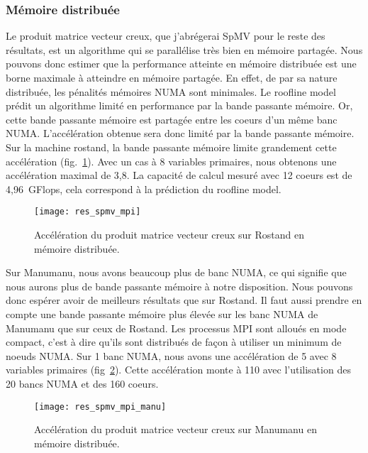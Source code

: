 \subsubsection{Mémoire distribuée}
Le produit matrice vecteur creux, que j'abrégerai SpMV pour le reste des résultats, est un algorithme qui se parallélise très bien en mémoire partagée.
%
Nous pouvons donc estimer que la performance atteinte en mémoire distribuée est une borne maximale à atteindre en mémoire partagée.
%
En effet, de par sa nature distribuée, les pénalités mémoires NUMA sont minimales.
%
Le roofline model prédit un algorithme limité en performance par la bande passante mémoire.
%
Or, cette bande passante mémoire est partagée entre les coeurs d'un même banc NUMA.
%
L'accélération obtenue sera donc limité par la bande passante mémoire.
%
Sur la machine rostand, la bande passante mémoire limite grandement cette accélération (fig.~\ref{fig:res_spmv_mpi_rostand}).
%
Avec un cas à 8 variables primaires, nous obtenons une accélération maximal de 3,8.
%
La capacité de calcul mesuré avec 12 coeurs est de 4,96~GFlops, cela correspond à la prédiction du roofline model.


\begin{figure}[t!]
  \centering
  \texttt{[image: res\_spmv\_mpi]}
  \caption{Accélération du produit matrice vecteur creux sur Rostand en mémoire distribuée.}
  \label{fig:res_spmv_mpi_rostand}
\end{figure}



Sur Manumanu, nous avons beaucoup plus de banc NUMA, ce qui signifie que nous aurons plus de bande passante mémoire à notre disposition.
%
Nous pouvons donc espérer avoir de meilleurs résultats que sur Rostand.
%
Il faut aussi prendre en compte une bande passante mémoire plus élevée sur les banc NUMA de Manumanu que sur ceux de Rostand.
%
Les processus MPI sont alloués en mode compact, c'est à dire qu'ils sont distribués de façon à utiliser un minimum de noeuds NUMA.
%
Sur 1 banc NUMA, nous avons une accélération de 5 avec 8 variables primaires (fig~\ref{fig:res_spmv_mpi_manumanu}).
%
Cette accélération monte à 110 avec l'utilisation des 20 bancs NUMA et des 160 coeurs.


\begin{figure}[t!]
  \centering
  \texttt{[image: res\_spmv\_mpi\_manu]}
  \caption{Accélération du produit matrice vecteur creux sur Manumanu en mémoire distribuée.}
  \label{fig:res_spmv_mpi_manumanu}
\end{figure}
